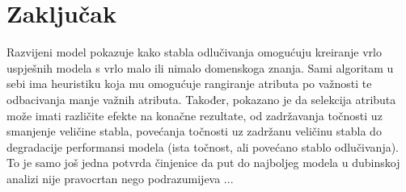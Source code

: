 \section*{Zaključak}
\label{ch:conc}

Razvijeni model pokazuje kako stabla odlučivanja omogućuju kreiranje vrlo uspješnih modela s vrlo malo ili nimalo domenskoga znanja. Sami algoritam u sebi ima heuristiku koja mu omogućuje rangiranje atributa po važnosti te odbacivanja manje važnih atributa. Također, pokazano je da selekcija atributa može imati različite efekte na konačne rezultate, od zadržavanja točnosti uz smanjenje veličine stabla, povećanja točnosti uz zadržanu veličinu stabla do degradacije performansi modela (ista točnost, ali povećano stablo odlučivanja). To je samo još jedna potvrda činjenice da put do najboljeg modela u dubinskoj analizi nije pravocrtan nego podrazumijeva ...
